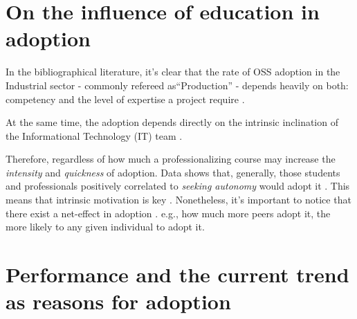 \documentclass[
12pt,				%
openright,			%
oneside,			%
a4paper,			%
brazil,				%
english,			%
]{abntex2}
\begin{document}
\section{On the influence of education in adoption}

In the bibliographical literature, it's clear that the rate of OSS adoption in the Industrial sector - commonly refereed as``Production'' - depends heavily on both: competency and the level of expertise a project require \cite{li2013all,gallego2015open,spinellis2012organizational}.

At the same time, the adoption depends directly on the intrinsic inclination of the Informational Technology (IT) team \cite{racero2021can}. 

Therefore, regardless of how much a professionalizing course may increase the \textit{intensity} and \textit{quickness} of adoption. Data shows that, generally, those students and professionals positively correlated to \textit{seeking autonomy} would adopt it \cite{racero2020predicting}. This means that intrinsic motivation is key \cite{gallego2015open}. Nonetheless, it's important to notice that there exist a net-effect in adoption \cite{spinellis2012organizational}. e.g., how much more peers adopt it, the more likely to any given individual to adopt it.      

\section{Performance and the current trend as reasons for adoption}
\end{document}
